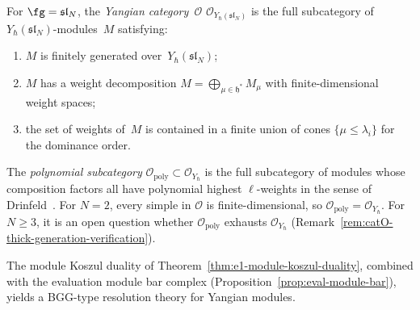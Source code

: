 \begin{definition}
\label{def:yangian-category-O}
For $\fg = \mathfrak{sl}_N$, the \emph{Yangian category~$\mathcal{O}$}
$\mathcal{O}_{Y_\hbar(\mathfrak{sl}_N)}$ is the full subcategory of
$Y_\hbar(\mathfrak{sl}_N)$-modules~$M$ satisfying:
\begin{enumerate}[label=\textup{(\roman*)}]
\item $M$ is finitely generated over~$Y_\hbar(\mathfrak{sl}_N)$;
\item $M$ has a weight decomposition
  $M = \bigoplus_{\mu \in \mathfrak{h}^*} M_\mu$ with
  finite-dimensional weight spaces;
\item the set of weights of~$M$ is contained in a finite union
  of cones $\{\mu \leq \lambda_i\}$ for the dominance order.
\end{enumerate}
The \emph{polynomial subcategory}
$\mathcal{O}_{\mathrm{poly}} \subset \mathcal{O}_{Y_\hbar}$ is the
full subcategory of modules whose composition factors all have
polynomial highest $\ell$-weights in the sense of
Drinfeld~\cite{Drinfeld88}.  For $N = 2$, every simple in
$\mathcal{O}$ is finite-dimensional, so
$\mathcal{O}_{\mathrm{poly}} = \mathcal{O}_{Y_\hbar}$.  For
$N \ge 3$, it is an open question whether
$\mathcal{O}_{\mathrm{poly}}$ exhausts $\mathcal{O}_{Y_\hbar}$
\textup{(}Remark~\textup{\ref{rem:catO-thick-generation-verification}}\textup{)}.
\end{definition}

The module Koszul duality of
Theorem~\ref{thm:e1-module-koszul-duality}, combined with
the evaluation module bar complex
(Proposition~\ref{prop:eval-module-bar}), yields a
BGG-type resolution theory for Yangian modules.

